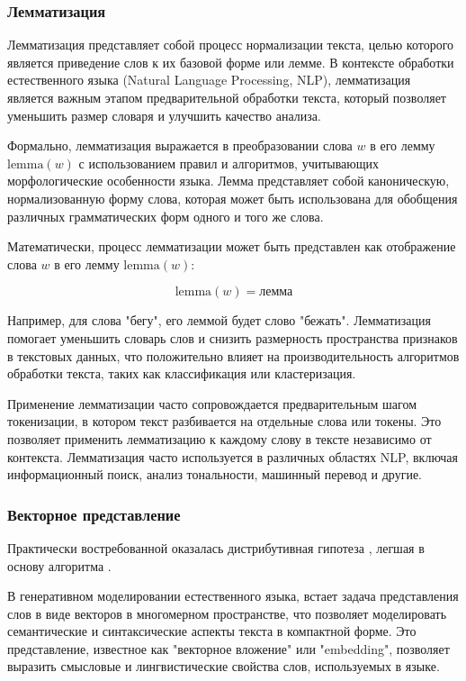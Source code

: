 \subsubsection{Лемматизация}

Лемматизация представляет собой процесс нормализации текста, целью которого является приведение слов к их базовой форме или лемме. В контексте обработки естественного языка (Natural Language Processing, NLP), лемматизация является важным этапом предварительной обработки текста, который позволяет уменьшить размер словаря и улучшить качество анализа.

Формально, лемматизация выражается в преобразовании слова \( w \) в его лемму \( \text{lemma}(w) \) с использованием правил и алгоритмов, учитывающих морфологические особенности языка. Лемма представляет собой каноническую, нормализованную форму слова, которая может быть использована для обобщения различных грамматических форм одного и того же слова.

Математически, процесс лемматизации может быть представлен как отображение слова \( w \) в его лемму \( \text{lemma}(w) \):

\[ \text{lemma}(w) = \text{лемма} \]

Например, для слова "бегу", его леммой будет слово "бежать". Лемматизация помогает уменьшить словарь слов и снизить размерность пространства признаков в текстовых данных, что положительно влияет на производительность алгоритмов обработки текста, таких как классификация или кластеризация.

Применение лемматизации часто сопровождается предварительным шагом токенизации, в котором текст разбивается на отдельные слова или токены. Это позволяет применить лемматизацию к каждому слову в тексте независимо от контекста. Лемматизация часто используется в различных областях NLP, включая информационный поиск, анализ тональности, машинный перевод и другие.

\subsubsection{Векторное представление}


Практически востребованной оказалась дистрибутивная гипотеза \cite{Schutze},
легшая в основу алгоритма \cite{NIPS2013_9aa42b31}.

В генеративном моделировании естественного языка, встает задача представления слов в виде векторов в многомерном пространстве, что позволяет моделировать семантические и синтаксические аспекты текста в компактной форме. Это представление, известное как "векторное вложение" или "embedding", позволяет выразить смысловые и лингвистические свойства слов, используемых в языке.

